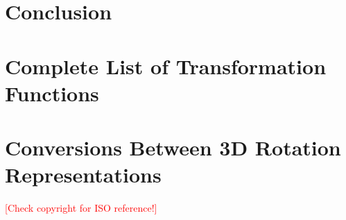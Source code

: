 \documentclass[12pt, twoside]{report}
\newcommand{\note}[1]{\textcolor{red}{[#1]}}
\begin{document}
\chapter{Conclusion}


\appendix

\chapter{Complete List of Transformation Functions}


\chapter{Conversions Between 3D Rotation Representations}


\nocite{*}
\printbibliography
\note{Check copyright for ISO reference!}
\end{document}

